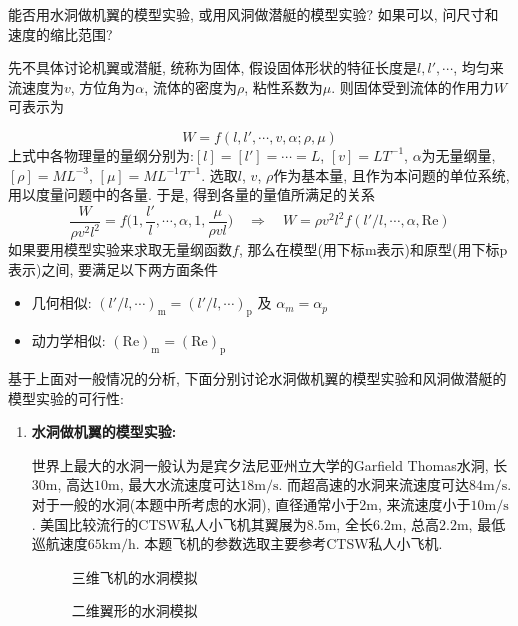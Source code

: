 \begin{problem}[12]
能否用水洞做机翼的模型实验, 或用风洞做潜艇的模型实验? 如果可以, 问尺寸和速度的缩比范围?
\end{problem}
\begin{solution}

\noindent\begin{minipage}[c]{0.7\linewidth}
先不具体讨论机翼或潜艇, 统称为固体, 假设固体形状的特征长度是$l, l', \cdots$, 均匀来流速度为$v$, 方位角为$\alpha$, 流体的密度为$\rho$, 粘性系数为$\mu$. 则固体受到流体的作用力$W$可表示为
\end{minipage}
\begin{minipage}[c]{0.3\linewidth}
\begin{center}
%

\end{center}
\end{minipage}
\[
W = f(l,l',\cdots, v, \alpha; \rho, \mu)
\]
上式中各物理量的量纲分别为:$[l]=[l']=\cdots=L$, $[v]=LT^{-1}$, $\alpha$为无量纲量, $[\rho]=ML^{-3}$, $[\mu]=ML^{-1}T^{-1}$. 选取$l$, $v$, $\rho$作为基本量, 且作为本问题的单位系统, 用以度量问题中的各量. 于是, 得到各量的量值所满足的关系
\[
\frac{W}{\rho v^2 l^2} = f\bigg(1,\frac{l'}{l},\cdots,\alpha,1,\frac{\mu}{\rho vl}\bigg) 
\quad\Longrightarrow\quad
 W = \rho v^2 l^2 f(l'/l,\cdots,\alpha,\mathrm{Re})
\]
如果要用模型实验来求取无量纲函数$f$, 那么在模型(用下标$\mathrm{m}$表示)和原型(用下标$\mathrm{p}$表示)之间, 要满足以下两方面条件
\begin{itemize}
\item 几何相似: $(l'/l,\cdots)_\mathrm{m}=(l'/l,\cdots)_\mathrm{p}$ 及 $\alpha_m = \alpha_p$
\item 动力学相似: $(\mathrm{Re})_\mathrm{m} = (\mathrm{Re})_\mathrm{p}$
\end{itemize}
基于上面对一般情况的分析, 下面分别讨论水洞做机翼的模型实验和风洞做潜艇的模型实验的可行性:
\begin{enumerate}
\item \textbf{水洞做机翼的模型实验:}

世界上最大的水洞一般认为是宾夕法尼亚州立大学的Garfield Thomas水洞\cite{Garfield,wiki_Water_tunnel}, 长$30\mathrm{m}$, 高达$10\mathrm{m}$, 最大水流速度可达$18\mathrm{m/s}$. 而超高速的水洞来流速度可达$84\mathrm{m/s}$\cite{Garfield}. 对于一般的水洞(本题中所考虑的水洞), 直径通常小于$2\mathrm{m}$, 来流速度小于$10\mathrm{m/s}$. 
美国比较流行的CTSW私人小飞机\cite{CTSW}其翼展为$8.5\mathrm{m}$, 全长$6.2\mathrm{m}$, 总高$2.2\mathrm{m}$, 最低巡航速度$65\mathrm{km/h}$. 本题飞机的参数选取主要参考CTSW私人小飞机.
\begin{figure}[!htb]
\centering
\begin{minipage}[t]{.495\linewidth}
\centering
 
\caption{\label{fig:3dAircraftModeling}三维飞机的水洞模拟}
\end{minipage}
\begin{minipage}[t]{.495\linewidth}
\centering

\caption{\label{fig:2dAircraftModeling}二维翼形的水洞模拟}
\end{minipage}
\end{figure}


\end{enumerate}
\end{solution}
